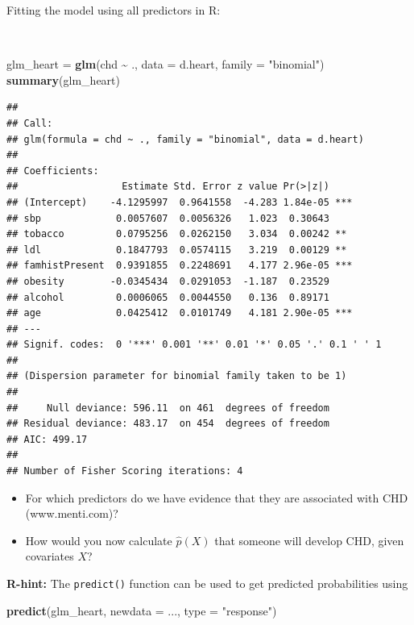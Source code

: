 \documentclass[
  10pt,
  ignorenonframetext,
]{beamer}
\newenvironment{Shaded}{\begin{snugshade}}{\end{snugshade}}
\newcommand{\AttributeTok}[1]{\textcolor[rgb]{0.13,0.29,0.53}{#1}}
\newcommand{\FunctionTok}[1]{\textcolor[rgb]{0.13,0.29,0.53}{\textbf{#1}}}
\newcommand{\NormalTok}[1]{#1}
\newcommand{\OtherTok}[1]{\textcolor[rgb]{0.56,0.35,0.01}{#1}}
\newcommand{\SpecialCharTok}[1]{\textcolor[rgb]{0.81,0.36,0.00}{\textbf{#1}}}
\newcommand{\StringTok}[1]{\textcolor[rgb]{0.31,0.60,0.02}{#1}}
\begin{document}
\begin{frame}[fragile]
Fitting the model using all predictors in R:

\(~\)

\tiny

\begin{Shaded}
\begin{Highlighting}[]
\NormalTok{glm\_heart }\OtherTok{=} \FunctionTok{glm}\NormalTok{(chd }\SpecialCharTok{\textasciitilde{}}\NormalTok{ ., }\AttributeTok{data =}\NormalTok{ d.heart, }\AttributeTok{family =} \StringTok{"binomial"}\NormalTok{)}
\FunctionTok{summary}\NormalTok{(glm\_heart)}
\end{Highlighting}
\end{Shaded}

\begin{verbatim}
## 
## Call:
## glm(formula = chd ~ ., family = "binomial", data = d.heart)
## 
## Coefficients:
##                  Estimate Std. Error z value Pr(>|z|)    
## (Intercept)    -4.1295997  0.9641558  -4.283 1.84e-05 ***
## sbp             0.0057607  0.0056326   1.023  0.30643    
## tobacco         0.0795256  0.0262150   3.034  0.00242 ** 
## ldl             0.1847793  0.0574115   3.219  0.00129 ** 
## famhistPresent  0.9391855  0.2248691   4.177 2.96e-05 ***
## obesity        -0.0345434  0.0291053  -1.187  0.23529    
## alcohol         0.0006065  0.0044550   0.136  0.89171    
## age             0.0425412  0.0101749   4.181 2.90e-05 ***
## ---
## Signif. codes:  0 '***' 0.001 '**' 0.01 '*' 0.05 '.' 0.1 ' ' 1
## 
## (Dispersion parameter for binomial family taken to be 1)
## 
##     Null deviance: 596.11  on 461  degrees of freedom
## Residual deviance: 483.17  on 454  degrees of freedom
## AIC: 499.17
## 
## Number of Fisher Scoring iterations: 4
\end{verbatim}
\end{frame}

\begin{frame}[fragile]
\begin{itemize}
\item
  For which predictors do we have evidence that they are associated with
  CHD (www.menti.com)?
\item
  How would you now calculate \(\hat{p}(X)\) that someone will develop
  CHD, given covariates \(X\)?
\end{itemize}

\vspace{5mm}

\textbf{R-hint:} The \texttt{predict()} function can be used to get
predicted probabilities using

\scriptsize

\begin{Shaded}
\begin{Highlighting}[]
\FunctionTok{predict}\NormalTok{(glm\_heart, }\AttributeTok{newdata =}\NormalTok{ ..., }\AttributeTok{type =} \StringTok{"response"}\NormalTok{)}
\end{Highlighting}
\end{Shaded}
\end{frame}
\end{document}

